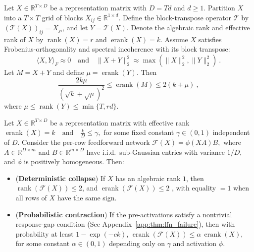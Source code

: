 \documentclass[sigconf,screen]{acmart}
\begin{document}
\begin{theorem}
\label{thm:erank-bound-blocktranspose}
Let $X\in\mathbb R^{T\times D}$ be a representation matrix with \(D = Td\) and \(d \ge 1\). Partition $X$ into a \( T \times T\) grid of blocks $X_{ij} \in \mathbb{R}^{1\times d}$. Define the block-transpose operator $\mathcal{T}$ by \((\mathcal{T}(X))_{ij}=X_{ji}\), and let $Y = \mathcal{T}(X)$. Denote the algebraic rank and effective rank of $X$ by $\operatorname{rank}(X)=r$ and $\operatorname{erank}(X)=k$. Assume $X$ satisfies Frobenius-orthogonality and spectral incoherence with its block transpose:
\[
\langle X, Y \rangle_F \approx 0 \quad \mathrm{and} \quad \|X+Y\|_{2}^2\approx \max(\|X\|_{2}^2,\|Y\|_{2}^2)\ .
\]
Let $M = X+Y$ and define $\mu = \operatorname{erank}(Y)$. Then
\[
\frac{2k\mu}{(\sqrt{k}+\sqrt{\mu})^2} \le \operatorname{erank}(M) \le 2 (k + \mu)\ ,
\]
where $\mu \le \operatorname{rank}(Y) \le \min\{T, rd\}$.
\end{theorem}

\begin{theorem}
\label{thm:ffn_failure}
Let $X\in\mathbb R^{T\times D}$ be a representation matrix with effective rank
\(
\operatorname{erank}(X)=k \quad\text{and}\quad \frac{k}{D}\le \gamma,
\)
for some fixed constant $\gamma\in(0,1)$ independent of $D$. 
Consider the per-row feedforward network 
\(
\mathcal F(X)=\phi(XA)B,
\)
where $A\in\mathbb R^{D\times m}$ and $B\in\mathbb R^{m\times D}$ have i.i.d.\ sub-Gaussian entries with variance $1/D$, and $\phi$ is positively homogeneous. 
Then:
\begin{itemize}[leftmargin=15pt,parsep=2pt,itemsep=2pt,topsep=2pt]
    \item (\textbf{Deterministic collapse})  
    If $X$ has an algebraic rank $1$, then
    \(
    \operatorname{rank}(\mathcal F(X))\le 2
    \), and 
    \(
    \operatorname{erank}(\mathcal F(X))\le 2
    \)
    , with equality $=1$ when all rows of $X$ have the same sign.
    \item (\textbf{Probabilistic contraction})  
    If the pre-activations satisfy a nontrivial response-gap condition (See Appendix~\ref{app:thm:ffn_failure}), then with probability at least $1-\exp(-c k)$,
    \(
    \operatorname{erank}(\mathcal F(X)) \le \alpha\,\operatorname{erank}(X),
    \)
    for some constant $\alpha\in(0,1)$ depending only on $\gamma$ and activation $\phi$.
\end{itemize}
\end{theorem}
\end{document}
